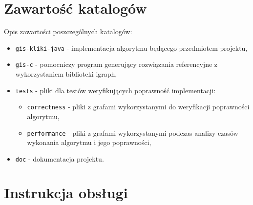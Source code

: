 \documentclass[12pt, a4paper]{article}
\begin{document}
\begin{appendices}
\section{Zawartość katalogów}

Opis zawartości poszczególnych katalogów:

\begin{itemize}
 \item \texttt{gis-kliki-java} - implementacja algorytmu będącego przedmiotem projektu,
 \item \texttt{gis-c} - pomocniczy program generujący rozwiązania referencyjne z wykorzystaniem biblioteki igraph,
 \item \texttt{tests} - pliki dla testów weryfikujących poprawność implementacji:
 	\begin{itemize}
 		\item \texttt{correctness} - pliki z grafami wykorzystanymi do weryfikacji poprawności algorytmu,
 		\item \texttt{performance} - pliki z grafami wykorzystanymi podczas analizy czasów wykonania algorytmu i jego poprawności,
 	\end{itemize}
 \item \texttt{doc} - dokumentacja projektu.
\end{itemize}

\section{Instrukcja obsługi}


\end{appendices}
\end{document}
